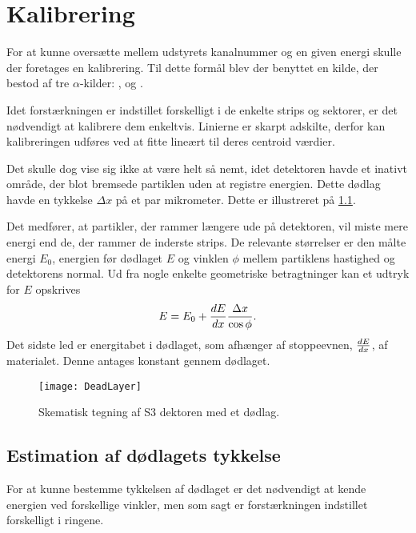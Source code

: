 \chapter{Kalibrering}
\label{cha:kalibrering}

For at kunne oversætte mellem udstyrets kanalnummer og en given energi skulle der foretages en
kalibrering. Til dette formål blev der benyttet en kilde, der bestod af tre $\alpha$-kilder:
,  og .

Idet forstærkningen er indstillet forskelligt i de enkelte strips og sektorer, er det
nødvendigt at kalibrere dem enkeltvis. Linierne er skarpt adskilte, derfor kan kalibreringen udføres
ved at fitte lineært til deres centroid værdier.  

Det skulle dog vise sig ikke at være helt så nemt, idet detektoren havde et inativt område, der blot
bremsede partiklen uden at registre energien. Dette dødlag havde en tykkelse $\Delta x$ på et par
mikrometer. Dette er illustreret på \ref{fig:deadLayer}.

Det medfører, at partikler, der rammer længere ude på detektoren, vil miste mere energi end de,
der rammer de inderste strips. De relevante størrelser er den målte energi $E_{0}$, energien før
dødlaget $E$ og vinklen $\phi$ mellem partiklens hastighed og detektorens normal. Ud fra nogle enkelte
geometriske betragtninger kan et udtryk for $E$ opskrives
\begin{equation}
  \label{eq:deadE}
  E = E_{0} + \frac{d E}{d x} \frac{\Delta x}{\cos \phi}  .
\end{equation}
Det sidste led er energitabet i dødlaget, som afhænger af stoppeevnen, $\frac{d E}{d x}$, af
materialet. Denne antages konstant gennem dødlaget. 
\begin{figure}[h]
  \centering
  \texttt{[image: DeadLayer]}
  \caption{Skematisk tegning af S3 dektoren med et dødlag.}
  \label{fig:deadLayer}
\end{figure}

\section{Estimation af dødlagets tykkelse}
\label{sec:dodlag}

For at kunne bestemme tykkelsen af dødlaget er det nødvendigt at kende energien ved forskellige
vinkler, men som sagt er forstærkningen indstillet forskelligt i ringene.


